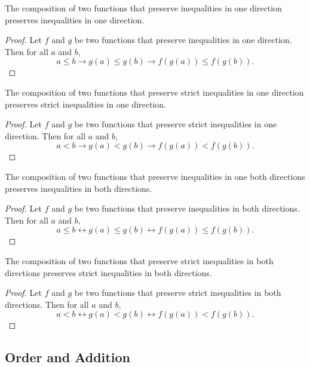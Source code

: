 \documentclass[../../math.tex]{subfiles}
\begin{document}
\begin{instance}
    The composition of two functions that preserve inequalities in one direction
    preserves inequalities in one direction.
\end{instance}
\begin{proof}
    Let $f$ and $g$ be two functions that preserve inequalities in one
    direction.  Then for all $a$ and $b$,
    \[
        a \leq b \to g(a) \leq g(b) \to f(g(a)) \leq f(g(b)).
    \]
\end{proof}

\begin{instance}
    The composition of two functions that preserve strict inequalities in one
    direction preserves strict inequalities in one direction.
\end{instance}
\begin{proof}
    Let $f$ and $g$ be two functions that preserve strict inequalities in one
    direction.  Then for all $a$ and $b$,
    \[
        a < b \to g(a) < g(b) \to f(g(a)) < f(g(b)).
    \]
\end{proof}

\begin{instance}
    The composition of two functions that preserve inequalities in one both
    directions preserves inequalities in both directions.
\end{instance}
\begin{proof}
    Let $f$ and $g$ be two functions that preserve inequalities in both
    directions.  Then for all $a$ and $b$,
    \[
        a \leq b \leftrightarrow g(a) \leq g(b) \leftrightarrow f(g(a)) \leq
        f(g(b)).
    \]
\end{proof}

\begin{instance}
    The composition of two functions that preserve strict inequalities in both
    directions preserves strict inequalities in both directions.
\end{instance}
\begin{proof}
    Let $f$ and $g$ be two functions that preserve strict inequalities in both
    directions.  Then for all $a$ and $b$,
    \[
        a < b \leftrightarrow g(a) < g(b) \leftrightarrow f(g(a)) < f(g(b)).
    \]
\end{proof}

\subsection{Order and Addition}
\end{document}
